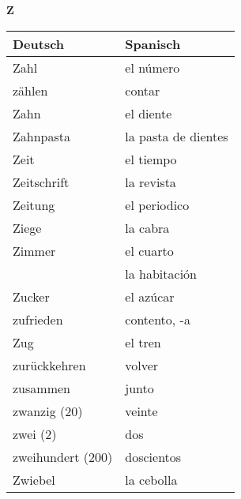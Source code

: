 \begin{flushright}\begin{Huge}\textbf{Z}\end{Huge}\end{flushright}

\begin{longtable}{p{} p{}} 
\textbf{Deutsch}     & \textbf{Spanisch}                                       \\ \hline
\hline
\endhead %
Zahl & el número \\
zählen & contar\\
Zahn & el diente\\
Zahnpasta & la pasta de dientes\\
Zeit & el tiempo\\
Zeitschrift & la revista\\
Zeitung & el periodico \\
Ziege & la cabra\\
Zimmer & el cuarto\\
~ & la habitación\\
Zucker & el azúcar\\
zufrieden & contento, -a\\
Zug & el tren\\
zurückkehren & volver\\
zusammen & junto\\
zwanzig (20) & veinte\\
zwei (2) & dos\\
zweihundert (200) & doscientos\\
Zwiebel & la cebolla\\

\end{longtable}
